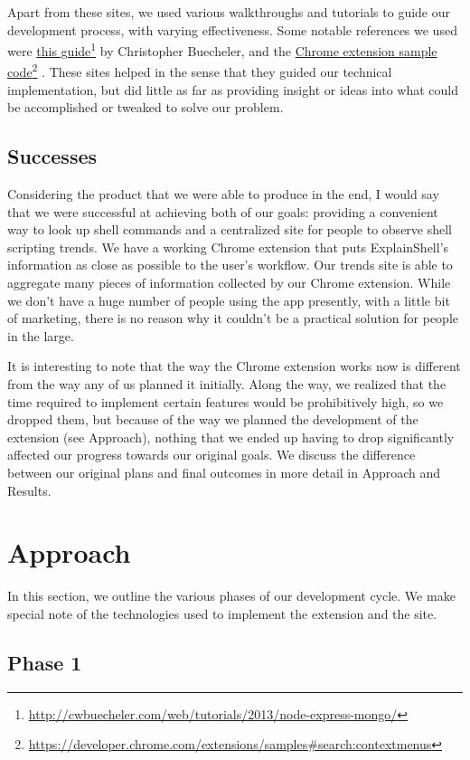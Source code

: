 \documentclass[11pt]{article}
\newcommand\fnurl[2]{%
\href{#1}{#2}\footnote{\url{#1}}%
}
\begin{document}
Apart from these sites, we used various walkthroughs and tutorials to guide our
development process, with varying effectiveness. Some notable references we used
were \fnurl{http://cwbuecheler.com/web/tutorials/2013/node-express-mongo/}{this
guide} by Christopher Buecheler, and the
\fnurl{https://developer.chrome.com/extensions/samples\#search:contextmenus}%
{Chrome extension sample code}. These sites helped in the sense that they guided
our technical implementation, but did little as far as providing insight or
ideas into what could be accomplished or tweaked to solve our problem.

\subsection{Successes}

Considering the product that we were able to produce in the end, I would say
that we were successful at achieving both of our goals: providing a convenient 
way to look up shell commands and a centralized site for people to observe shell
scripting trends. We have a working Chrome extension that puts ExplainShell's 
information as close as possible to the user's workflow. Our trends site is able 
to aggregate many pieces of information collected by our Chrome extension. While 
we don't have a huge number of people using the app presently, with a little bit 
of marketing, there is no reason why it couldn't be a practical solution for people 
in the large.

It is interesting to note that the way the Chrome extension works now is
different from the way any of us planned it initially. Along the way, we
realized that the time required to implement certain features would be
prohibitively high, so we dropped them, but because of the way we planned the
development of the extension (see Approach), nothing that we ended up having to
drop significantly affected our progress towards our original goals. We discuss
the difference between our original plans and final outcomes in more detail in
Approach and Results.

\section{Approach}

In this section, we outline the various phases of our development cycle. We make
special note of the technologies used to implement the extension and the site.

\subsection{Phase 1}
\end{document}
